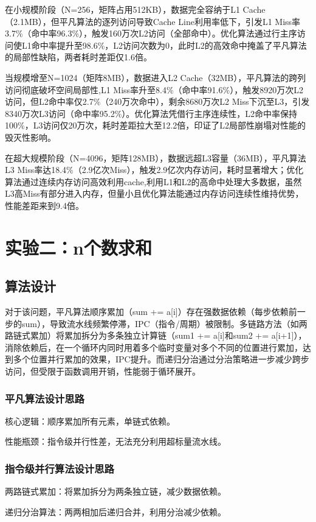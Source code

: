 \documentclass[a4paper]{article}
\begin{document}
在小规模阶段（N=256，矩阵占用512KB），数据完全容纳于L1 Cache（2.1MB），但平凡算法的逐列访问导致Cache Line利用率低下，引发L1 Miss率3.7\%（命中率96.3\%），触发160万次L2访问（全部命中）。优化算法通过行主序访问使L1命中率提升至98.6\%，L2访问次数为0，此时L2的高效命中掩盖了平凡算法的局部性缺陷，两者耗时差距仅1.6倍。

当规模增至N=1024（矩阵8MB），数据进入L2 Cache（32MB），平凡算法的跨列访问彻底破坏空间局部性,L1 Miss率升至8.4\%（命中率91.6\%），触发8920万次L2访问，但L2命中率仅2.7\%（240万次命中），剩余8680万次L2 Miss下沉至L3，引发8340万次L3访问（命中率95.2\%）。优化算法凭借行主序连续性，L2命中率保持100\%，L3访问仅20万次，耗时差距拉大至12.2倍，印证了L2局部性崩塌对性能的毁灭性影响。

在超大规模阶段（N=4096，矩阵128MB），数据远超L3容量（36MB），平凡算法L3 Miss率达18.4\%（2.9亿次Miss），触发2.9亿次内存访问，耗时显著增大；优化算法通过连续内存访问高效利用cache,利用L1和L2的高命中处理大多数据，虽然L3高Miss有部分进入内存，但量小且优化算法能通过内存访问连续性维持优势，性能差距来到9.4倍。

\section{实验二：n个数求和}
\subsection{算法设计}
对于该问题，平凡算法顺序累加（sum += a[i]）存在强数据依赖（每步依赖前一步的sum），导致流水线频繁停滞，IPC（指令/周期）被限制。多链路方法（如两路链式累加）将累加拆分为多条独立计算链（sum1 += a[i]和sum2 += a[i+1]），消除依赖后，在一个循环内同时用着多个临时变量对多个不同的位置进行累加，达到多个位置并行累加的效果，IPC提升。而递归分治通过分治策略进一步减少跨步访问，但受限于函数调用开销，性能弱于循环展开。
\subsubsection{平凡算法设计思路}
核心逻辑：顺序累加所有元素，单链式依赖。

性能瓶颈：指令级并行性差，无法充分利用超标量流水线。
\subsubsection{指令级并行算法设计思路}
两路链式累加：将累加拆分为两条独立链，减少数据依赖。

递归分治算法：两两相加后递归合并，利用分治减少依赖。
\end{document}
